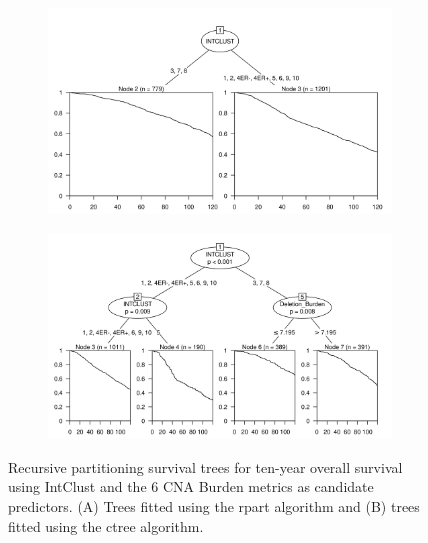 \begin{figure}[!htb]
\centering

\vspace{0.5cm}

\begin{subfigure}{\textwidth}
\subcaption{}
\includegraphics[width=1\textwidth]{../figures/Appendices/Appendix_B/PartyKit_Survival_Burden_TenYearOS_INTCLUST.png}
\end{subfigure}

\vspace{2cm}

\begin{subfigure}{\textwidth}
\subcaption{}
\includegraphics[width=1\textwidth]{../figures/Appendices/Appendix_B/Ctree_Survival_Burden_TenYearOS_INTCLUST.png}
\end{subfigure}

\vspace{0.5cm}

\caption[Recursive partitioning survival trees for ten-year overall survival using IntClust and the 6 CNA Burden metrics as candidate predictors.]{Recursive partitioning survival trees for ten-year overall survival using IntClust and the 6 CNA Burden metrics as candidate predictors. (A) Trees fitted using the rpart algorithm and (B) trees fitted using the ctree algorithm.}
\end{figure}

